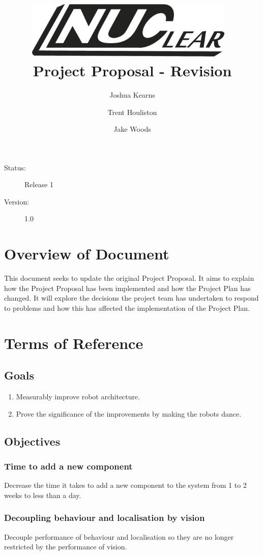 \documentclass[english,12pt]{scrartcl}
\title{\includegraphics[width=0.75\textwidth]{./Logo/NUClear-logo}~\\[1cm] Project Proposal - Revision}
\author{Joshua Kearns \and Trent Houliston \and Jake Woods}
\begin{document}
	\maketitle
	\vfill
	{\large
		\begin{description}
			\item [Status:] Release 1
			\item [Version:] 1.0
		\end{description}}

	\clearpage
	\tableofcontents
	\clearpage

	\section{Overview of Document}
	This document seeks to update the original Project Proposal.
	It aims to explain how the Project Proposal has been implemented and how the Project Plan has changed.
	It will explore the decisions the project team has undertaken to respond to problems and how this has affected the implementation of the Project Plan.

	\section{Terms of Reference}
		\subsection {Goals}
			\begin{enumerate}
				\item Measurably improve robot architecture.
				\item Prove the significance of the improvements by making the robots dance. 
			\end{enumerate}
		\subsection {Objectives}
			\subsubsection{Time to add a new component}
				Decrease the time it takes to add a new component to the system from 1 to 2 weeks to less than a day.
			
			\subsubsection{Decoupling behaviour and localisation by vision}
				Decouple performance of behaviour and localisation so they are no longer restricted by the performance of vision.
			
\end{document}
